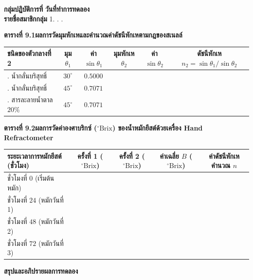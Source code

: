 \begin{worksheetbox}
\textbf{กลุ่มปฏิบัติการที่} \dotfill \textbf{วันที่ทำการทดลอง} \dotfill\\[4pt]
\textbf{รายชื่อสมาชิกกลุ่ม} 1. . . \dotfill

\vspace{4pt}
\textbf{ตารางที่ 9.1\quad ผลการวัดมุมหักเหและคำนวณค่าดัชนีหักเหตามกฎของสเนลล์}
\begin{center}
\footnotesize\setlength{\tabcolsep}{3.5pt}
\begin{tabularx}{\linewidth}{>{\raggedright\arraybackslash}X c c c c c}
\toprule
\textbf{ชนิดของตัวกลางที่ 2} & \textbf{มุม $\theta_1$} & \textbf{ค่า $\sin\theta_1$} & \textbf{มุมหักเห $\theta_2$} & \textbf{ค่า $\sin\theta_2$} & \textbf{ดัชนีหักเห $n_2 = \sin\theta_1/\sin\theta_2$} \\
\midrule
1. น้ำกลั่นบริสุทธิ์ & $30^\circ$ & $0.5000$ & \dotfill & \dotfill & \dotfill \\[6pt]
2. น้ำกลั่นบริสุทธิ์ & $45^\circ$ & $0.7071$ & \dotfill & \dotfill & \dotfill \\[6pt]
3. สารละลายน้ำตาล $20\%$ & $45^\circ$ & $0.7071$ & \dotfill & \dotfill & \dotfill \\
\bottomrule
\end{tabularx}
\end{center}

\vspace{4pt}
\textbf{ตารางที่ 9.2\quad ผลการวัดค่าองศาบริกซ์ ($^\circ\text{Brix}$) ของน้ำหมักยีสต์ด้วยเครื่อง Hand Refractometer}
\begin{center}
\footnotesize\setlength{\tabcolsep}{3.5pt}
\begin{tabularx}{\linewidth}{>{\raggedright\arraybackslash}X c c c c}
\toprule
\textbf{ระยะเวลาการหมักยีสต์ (ชั่วโมง)} & \textbf{ครั้งที่ 1 ($^\circ\text{Brix}$)} & \textbf{ครั้งที่ 2 ($^\circ\text{Brix}$)} & \textbf{ค่าเฉลี่ย $B$ ($^\circ\text{Brix}$)} & \textbf{ค่าดัชนีหักเหคำนวณ $n$} \\
\midrule
ชั่วโมงที่ $0$ (เริ่มต้นหมัก) & \dotfill & \dotfill & \dotfill & \dotfill \\[6pt]
ชั่วโมงที่ $24$ (หมักวันที่ 1) & \dotfill & \dotfill & \dotfill & \dotfill \\[6pt]
ชั่วโมงที่ $48$ (หมักวันที่ 2) & \dotfill & \dotfill & \dotfill & \dotfill \\[6pt]
ชั่วโมงที่ $72$ (หมักวันที่ 3) & \dotfill & \dotfill & \dotfill & \dotfill \\
\bottomrule
\end{tabularx}
\end{center}

\vspace{4pt}
\textbf{สรุปและอภิปรายผลการทดลอง}\\[4pt]
\dotfill\\[6pt]
\dotfill
\end{worksheetbox}

